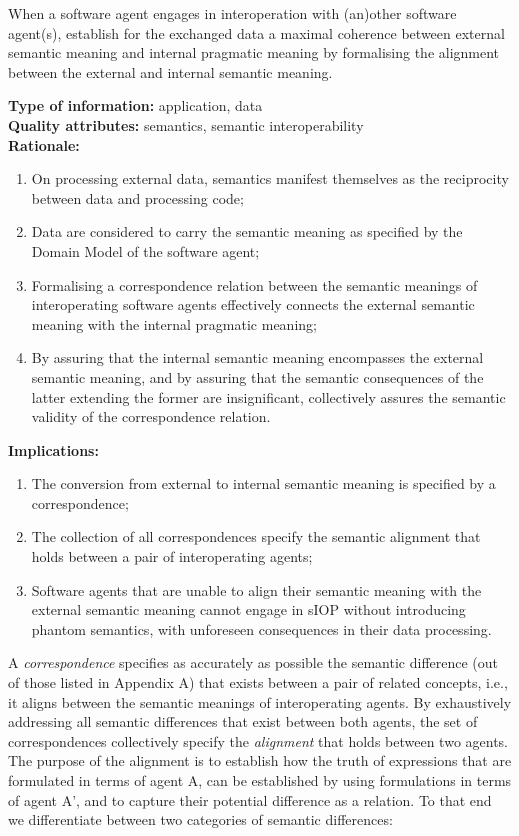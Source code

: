 \documentclass[sort&compress,preprint,authoryear,3p,twocolumn]{elsarticle}
\begin{document}
\begin{mmdp}\label{dp:alignment}

When a software agent engages in interoperation with (an)other software agent(s), establish for the exchanged data a maximal coherence between external semantic meaning and internal pragmatic meaning by formalising the alignment between the external and internal semantic meaning.   

\textbf{Type of information:} application, data  \\
\textbf{Quality attributes:} semantics, semantic interoperability   \\
\textbf{Rationale:}
\begin{enumerate}
  \item On processing external data, semantics manifest themselves as the reciprocity between data and processing code;
  \item Data are considered to carry the semantic meaning as specified by the Domain Model of the software agent;
  \item Formalising a correspondence relation between the semantic meanings of interoperating software agents effectively connects the external semantic meaning with the internal pragmatic meaning;
  \item By assuring that the internal semantic meaning encompasses the external semantic meaning, and by assuring that the semantic consequences of the latter extending the former are insignificant, collectively assures the semantic validity of the correspondence relation.
\end{enumerate}
\textbf{Implications:}
\begin{enumerate}
  \item The conversion from external to internal semantic meaning is specified by a correspondence;
  \item The collection of all correspondences specify the semantic alignment that holds between a pair of interoperating agents;
  \item Software agents that are unable to align their semantic meaning with the external semantic meaning cannot engage in sIOP without introducing phantom semantics, with unforeseen consequences in their data processing.
\end{enumerate}  
\end{mmdp}

A \emph{correspondence} specifies as accurately as possible the semantic
difference (out of those listed in Appendix A) that exists between a
pair of related concepts, i.e., it aligns between the semantic meanings
of interoperating agents. By exhaustively addressing all semantic
differences that exist between both agents, the set of correspondences
collectively specify the \emph{alignment} that holds between two agents.
The purpose of the alignment is to establish how the truth of
expressions that are formulated in terms of agent A, can be established
by using formulations in terms of agent A', and to capture their
potential difference as a relation. To that end we differentiate between
two categories of semantic differences:
\end{document}
